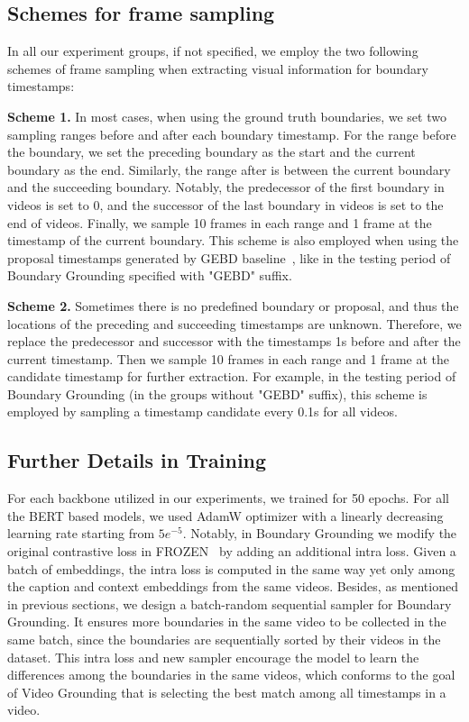 \documentclass[runningheads]{llncs}
\begin{document}
\subsection{Schemes for frame sampling}
In all our experiment groups, if not specified, we employ the two following schemes of frame sampling when extracting visual information for boundary timestamps: 

\textbf{Scheme 1.} In most cases, when using the ground truth boundaries, we set two sampling ranges before and after each boundary timestamp. For the range before the boundary, we set the preceding boundary as the start and the current boundary as the end. Similarly, the range after is between the current boundary and the succeeding boundary. Notably, the predecessor of the first boundary in videos is set to 0, and the successor of the last boundary in videos is set to the end of videos. Finally, we sample 10 frames in each range and 1 frame at the timestamp of the current boundary. This scheme is also employed when using the proposal timestamps generated by GEBD baseline~\cite{shou2021generic}, like in the testing period of Boundary Grounding specified with "GEBD" suffix. 

\textbf{Scheme 2.} Sometimes there is no predefined boundary or proposal, and thus the locations of the preceding and succeeding timestamps are unknown. Therefore, we replace the predecessor and successor with the timestamps 1s before and after the current timestamp. Then we sample 10 frames in each range and 1 frame at the candidate timestamp for further extraction. For example, in the testing period of Boundary Grounding (in the groups without "GEBD" suffix), this scheme is employed by sampling a timestamp candidate every 0.1s for all videos.


\subsection{Further Details in Training}

For each backbone utilized in our experiments, we trained for 50 epochs. For all the BERT based models, we used AdamW optimizer with a linearly decreasing learning rate starting from $5e^{-5}$. Notably, in Boundary Grounding we modify the original contrastive loss in FROZEN~\cite{bain2021frozen} by adding an additional intra loss. Given a batch of embeddings, the intra loss is computed in the same way yet only among the caption and context embeddings from the same videos. Besides, as mentioned in previous sections, we design a batch-random sequential sampler for Boundary Grounding. It ensures more boundaries in the same video to be collected in the same batch, since the boundaries are sequentially sorted by their videos in the dataset. This intra loss and new sampler encourage the model to learn the differences among the boundaries in the same videos, which conforms to the goal of Video Grounding that is selecting the best match among all timestamps in a video.
\end{document}
